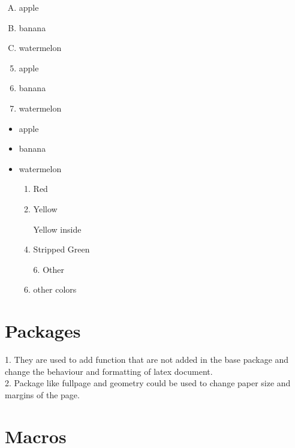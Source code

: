 \documentclass{article}
\begin{document}
\vspace{0.25cm}

\begin{enumerate}[A.] %
    \item apple
    \item banana
    \item watermelon
\end{enumerate}

\vspace{0.25cm}

\begin{enumerate}\setcounter{enumi}{4} %
    \item apple
    \item banana
    \item watermelon
\end{enumerate}

\vspace{0.25cm}

\begin{itemize}
    \item apple
    \item banana
    \item watermelon
    \begin{enumerate}
        \item Red
        \item Yellow
        \item[] Yellow inside %
        \item Stripped Green
        \item[6.] Other %
        \item other colors
    \end{enumerate}
\end{itemize}

\section{Packages}

1. They are used to add function that are not added in the base package and change the behaviour and formatting of latex document.\\
2. Package like fullpage and geometry could be used to change paper size and margins of the page.

\section{Macros}
\end{document}
